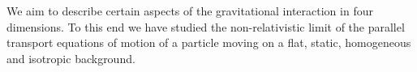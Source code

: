 \documentclass[twocolumn,
  showpacs,showkeys,prd,superscriptaddress]{revtex4-1}
\begin{document}
We aim to describe certain aspects of the gravitational interaction in four dimensions. To this end we have studied the non-relativistic limit of the parallel transport equations of motion of a particle moving on a flat, static, homogeneous and isotropic background.







\end{document}
